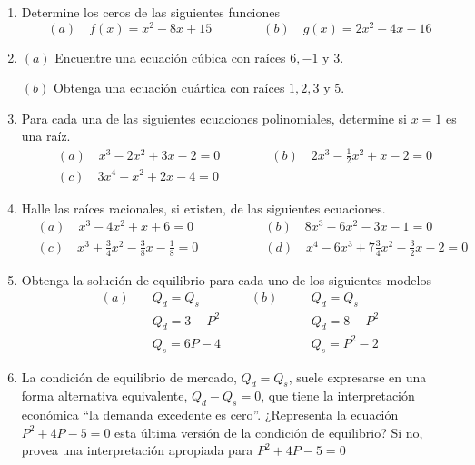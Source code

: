 \begin{ejercicio}
    \begin{enumerate}
        \item Determine los ceros de las siguientes funciones
        \[
        (a)\quad f(x)=x^2-8x+15 \qquad \qquad (b) \quad g(x) = 2x^2-4x-16
        \]
        \item \((a)\) Encuentre una ecuación cúbica con raíces \(6,-1\) y \(3\).
        
        \((b)\) Obtenga una ecuación cuártica con raíces \(1,2,3\) y \(5\).
        \item Para cada una de las siguientes ecuaciones polinomiales, determine si \(x=1\) es una raíz.
            \begin{equation}
                \begin{aligned}
                    &(a) \quad x^3-2x^2+3x-2=0 \qquad \qquad (b) \quad 2x^3 - \frac{1}{2}x^2+x-2=0 \\
                    &(c) \quad 3x^4-x^2+2x-4=0
                \end{aligned}
            \end{equation} 
        \item Halle las raíces racionales, si existen, de las siguientes ecuaciones.
            \begin{equation}
                \begin{aligned}
                    &(a) \quad x^3-4x^2+x+6=0 \qquad \qquad &&(b) \quad 8x^3 - 6x^2-3x-1=0 \\
                    &(c) \quad x^3+\frac{3}{4}x^2-\frac{3}{8}x-\frac{1}{8}=0  &&(d) \quad x^4 - 6x^3 + 7\frac{3}{4}x^2-\frac{3}{2}x-2=0
                \end{aligned}
            \end{equation}         
        \item Obtenga la solución de equilibrio para cada uno de los siguientes modelos
            \begin{equation}
                \begin{aligned}
                    (a)\quad & Q_d = Q_s  \qquad \qquad (b) \quad &&Q_d = Q_s \\
                    & Q_d=3-P^2    &&Q_d = 8-P^2 \\
                    & Q_s=6P-4     &&Q_s = P^2-2
                \end{aligned}
            \end{equation}         
        \item La condición de equilibrio de mercado, \(Q_d = Q_s\), suele expresarse en una forma alternativa equivalente, \(Q_d - Q_s = 0\), que tiene la interpretación económica ``la demanda excedente es cero''. ¿Representa la ecuación \(P^2+4P -5 = 0\) esta última versión de la condición de equilibrio? Si no, provea una interpretación apropiada para \(P^2+4P -5 = 0\)

\end{enumerate}
\end{ejercicio}
